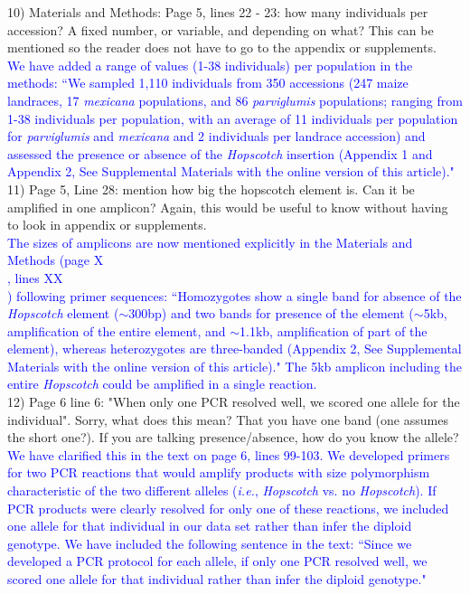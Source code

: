 \documentclass[11pt]{article}
\newcommand{\res}[1]{\noindent \textcolor{blue}{{#1}} \\}
\newcommand{\mbh}[1]{\noindent \textcolor{Dandelion}{{#1}}\\}
\begin{document}
10) Materials and Methods:
Page 5, lines 22 - 23: how many individuals per accession? A fixed number, or variable, and depending on what? This can be mentioned so the reader does not have to go to the appendix or supplements.\\ 

\res{We have added a range of values (1-38 individuals) per population in the methods: ``We sampled 1,110 individuals from 350 accessions (247 maize landraces, 17 \emph{mexicana} populations, and 86 \emph{parviglumis} populations; ranging from 1-38 individuals per population, with an average of 11 individuals per population for \emph{parviglumis} and \emph{mexicana} and 2 individuals per landrace accession) and assessed the presence or absence of the \emph{Hopscotch} insertion (Appendix 1 and Appendix 2, See Supplemental Materials with the online version of this article)."}


11) Page 5, Line 28: mention how big the hopscotch element is.  Can it be amplified in one amplicon? Again, this would be useful to know without having to look in appendix or supplements.\\

\res{The sizes of amplicons are now mentioned explicitly in the Materials and Methods (page \mbh{X}, lines \mbh{XX}) following primer sequences: 
``Homozygotes show a single band for absence of the \emph{Hopscotch} element ($\sim$300bp) and two bands for presence of the element ($\sim$5kb, amplification of the entire element, and $\sim$1.1kb, amplification of part of the element), whereas heterozygotes are three-banded (Appendix 2, See Supplemental Materials with the online version of this article)."
The 5kb amplicon including the entire \emph{Hopscotch} could be amplified in a single reaction.}

12) Page 6 line 6: "When only one PCR resolved well, we scored one allele for the individual".  Sorry, what does this mean? That you have one band (one assumes the short one?). If you are talking presence/absence, how do you know the allele?\\ 

\res{We have clarified this in the text on page 6, lines 99-103.  We developed primers for two PCR reactions that would amplify products with size polymorphism characteristic of the two different alleles (\emph{i.e.}, \emph{Hopscotch} vs. no \emph{Hopscotch}). If PCR products were clearly resolved for only one of these reactions, we included one allele for that individual in our data set rather than infer the diploid genotype. We have included the following sentence in the text: ``Since we developed a PCR protocol for each allele, if only one PCR resolved well, we scored one allele for that individual rather than infer the diploid genotype."}
\end{document}
